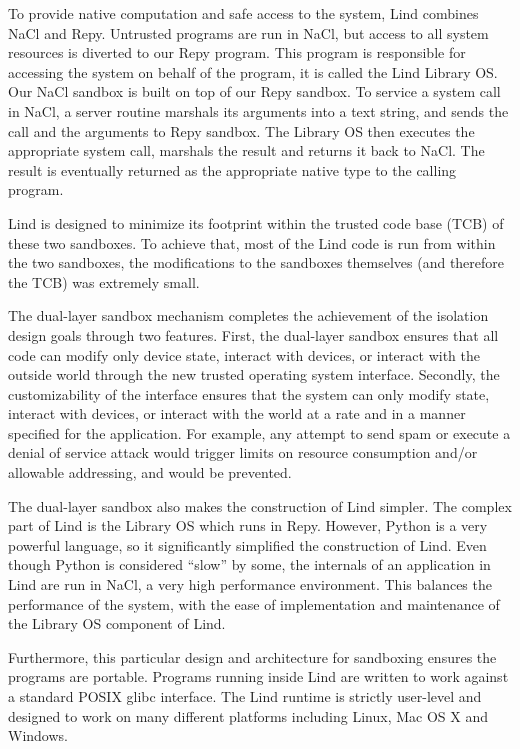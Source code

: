 To provide native computation and safe access to the system, Lind combines NaCl and Repy. 
Untrusted programs are run in NaCl, but access to all system resources is diverted to our Repy program. 
This program is responsible for accessing the system on behalf of the program, it is called the Lind Library OS. 
Our NaCl sandbox is built on top of our Repy sandbox. To service a system call in NaCl, a server routine 
marshals its arguments into a text string, and sends the call and the arguments to Repy sandbox. 
The Library OS then executes the appropriate system call, marshals the result and returns it back to NaCl. 
The result is eventually returned as the appropriate native type to the calling program. 

Lind is designed to minimize its footprint within the trusted code base (TCB) of these two sandboxes. 
To achieve that, most of the Lind code is run from within the two sandboxes, the modifications to 
the sandboxes themselves (and therefore the TCB) was extremely small. 

The dual-layer sandbox mechanism completes the achievement of the isolation design goals through 
two features. First, the dual-layer sandbox ensures that all code can modify only device state, 
interact with devices, or interact with the outside world through the new trusted operating system interface. 
Secondly, the customizability of the interface ensures that the system can only modify state, interact with 
devices, or interact with the world at a rate and in a manner specified for the application. For example, 
any attempt to send spam or execute a denial of service attack would trigger limits on resource 
consumption and/or allowable addressing, and would be prevented. 

The dual-layer sandbox also makes the construction of Lind simpler. The complex part of Lind is the 
Library OS which runs in Repy. However, Python is a very powerful language, so it significantly simplified 
the construction of Lind. Even though Python is considered ``slow'' by some, the internals of 
an application in Lind are run in NaCl, a very high performance environment. 
This balances the performance of the system, with the ease of implementation and maintenance 
of the Library OS component of Lind. 

Furthermore, this particular design and architecture for sandboxing ensures the programs are portable. 
Programs running inside Lind are written to work against a standard POSIX glibc interface. 
The Lind runtime is strictly user-level and designed to work on many different platforms including Linux, 
Mac OS X and Windows.

